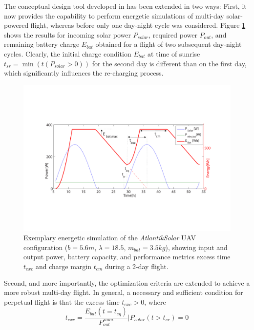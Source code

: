 \label{sec:ExtensionOptCriteria}
The conceptual design tool developed in \cite{Noth_PhD,Leutenegger_JIRS} has been extended in two ways: First, it now provides the capability to perform energetic simulations of multi-day solar-powered flight, whereas before only one day-night cycle was considered. Figure \ref{fig:EnergySimulation} shows the results for incoming solar power $P_{solar}$, required power $P_{out}$, and remaining battery charge $E_{bat}$ obtained for a flight of two subsequent day-night cycles. Clearly, the initial charge condition $E_{bat}$ at time of sunrise $t_{sr}=\min(t(P_{solar}>0))$ for the second day is different than on the first day, which significantly influences the re-charging process. 
\begin{figure}[tb]
    \centering
    \includegraphics[width=\linewidth]{images/2_EnergySimulation.pdf}
    \caption{Exemplary energetic simulation of the \textit{AtlantikSolar} UAV configuration ($b=5.6m$, $\lambda=18.5$, $m_{bat}=3.5kg$), showing input and output power, battery capacity, and performance metrics excess time $t_{exc}$ and charge margin $t_{cm}$ during a 2-day flight.}
    \label{fig:EnergySimulation}
\end{figure}
Second, and more importantly, the optimization criteria are extended to achieve a more robust multi-day flight. In general, a necessary and sufficient condition for perpetual flight is that the excess time $t_{exc}>0$, where
\begin{equation} \label{eqn:t_exc}
t_{exc}=\frac{E_{bat}(t=t_{eq})}{P_{out}^{\,nom}} \Big| P_{solar}(t>t_{sr})=0
\end{equation}
